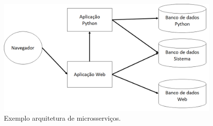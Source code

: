 \begin{figure}[H]
	\centering
	\includegraphics[width=1\linewidth]{figuras/WebService/microservices.png}
	\caption{Exemplo arquitetura de microsserviços.}
	\label{fig:arquitetura-microsservicos}
\end{figure}

 






